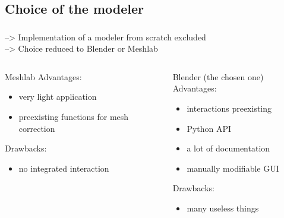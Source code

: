\documentclass{beamer}
\begin{document}
\subsection{Choice of the modeler}
\begin{frame}
	\frametitle{}
		--> Implementation of a modeler from scratch excluded \\
		--> Choice reduced to Blender or Meshlab
    \begin{columns}[t]
  	\begin{column}{5cm}
  		\begin{block}{Meshlab}
  		Advantages:
  		\begin{itemize}
  		\item very light application
  		\item preexisting functions for mesh correction
  		\end{itemize}
  		
  		Drawbacks:
  		\begin{itemize}
  		\item no integrated interaction
  		\end{itemize}
 	 	\end{block}   
  	\end{column}
  
  	\begin{column}{5cm}
  		\begin{block}{Blender (the chosen one)}
  		Advantages:
  		\begin{itemize}
  		\item interactions preexisting 
  		\item Python API  
  		\item a lot of documentation
  		\item manually modifiable GUI
  		\end{itemize}
  		
  		Drawbacks:
  		\begin{itemize}
  		\item many useless things
  		\end{itemize}
 	 	\end{block}   
  	\end{column}
 	\end{columns}  
    
\end{frame}
\end{document}
